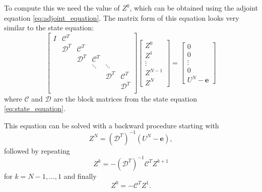 \documentclass[utf8,english]{gradu3}
\begin{document}
To compute this we need the value of $Z^0$,
which can be obtained using the adjoint equation \eqref{eq:adjoint_equation}.
The matrix form of this equation looks very similar to the state equation:
\begin{equation}\label{eq:adjoint_equation_matrix}
  \begin{bmatrix}
    I & \mathcal{C}^T \\
    & \mathcal{D}^T & \mathcal{C}^T \\
    & & \mathcal{D}^T & \mathcal{C}^T \\
    & & & \ddots & \ddots \\
    & & & & \mathcal{D}^T & \mathcal{C}^T \\
    & & & & & \mathcal{D}^T \\
  \end{bmatrix}
  \begin{bmatrix}
    Z^0 \\ Z^1 \\ \vdots \\ Z^{N-1} \\ Z^N
  \end{bmatrix}
  = \begin{bmatrix}
    0 \\ 0 \\ \vdots \\ 0 \\ U^N - \mathbf{e}
  \end{bmatrix}
\end{equation}
where $\mathcal{C}$ and $\mathcal{D}$ are the block matrices
from the state equation \eqref{eq:state_equation}.

This equation can be solved with a backward procedure starting with
\begin{equation}\label{eq:adjoint_sim_start}
  Z^N = (\mathcal{D}^T)^{-1} (U^N - \mathbf{e}),
\end{equation}
followed by repeating
\begin{equation}\label{eq:adjoint_sim_step}
  Z^k = -(\mathcal{D}^T)^{-1} \mathcal{C}^T Z^{k+1}
\end{equation}
for $k = N-1, \dots, 1$ and finally
\begin{equation}\label{eq:adjoint_sim_final}
  Z^0 = -\mathcal{C}^T Z^1.
\end{equation}
\end{document}
